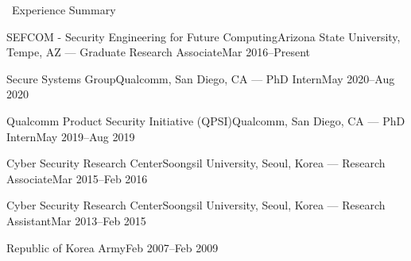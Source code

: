 \documentclass{resume} %
\begin{document}
\begin{rSection}{\faGenderless~Experience Summary}

	\begin{rSubsection2}
		{SEFCOM - {\small Security Engineering for Future Computing}}{Arizona State University, Tempe, AZ}
		{--- Graduate Research Associate}{Mar 2016--Present}
	\end{rSubsection2}
    \vspace{-3mm}

    \begin{rSubsection2}
        {Secure Systems Group}{Qualcomm, San Diego, CA}
        {--- PhD Intern}{May 2020--Aug 2020}
    \end{rSubsection2}
    \vspace{-3mm}

    \begin{rSubsection2}
        {Qualcomm Product Security Initiative (QPSI)}{Qualcomm, San Diego, CA}
        {--- PhD Intern}{May 2019--Aug 2019}
    \end{rSubsection2}
    \vspace{-3mm}

	\begin{rSubsection2}
		{Cyber Security Research Center}{Soongsil University, Seoul, Korea}
		{--- Research Associate}{Mar 2015--Feb 2016}
	\end{rSubsection2}
	\vspace{-3mm}
	\begin{rSubsection2}
		{Cyber Security Research Center}{Soongsil University, Seoul, Korea}
		{--- Research Assistant}{Mar 2013--Feb 2015}
	\end{rSubsection2}
	\vspace{-3mm}

	\begin{rSubsection2}
		{Republic of Korea Army}{Feb 2007--Feb 2009}
		{}{}
	\end{rSubsection2}

\vspace{3mm}
\end{rSection}
\end{document}
